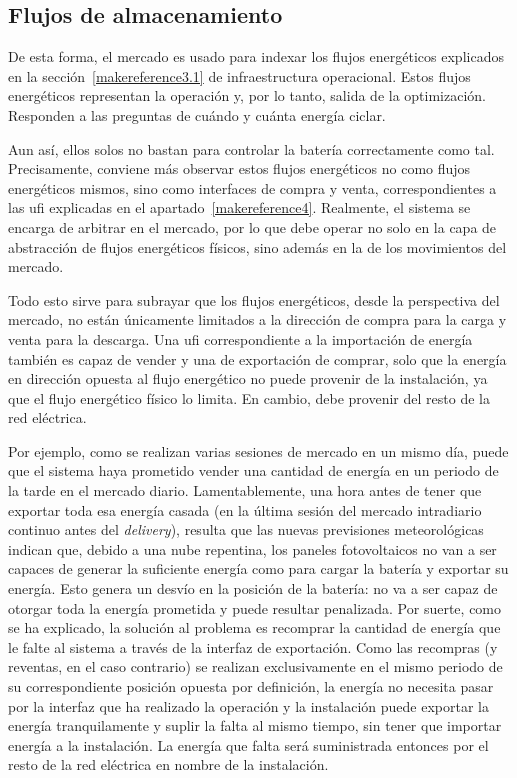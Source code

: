 \subsection{Flujos de almacenamiento}%
\label{makereference5.1.2}

De esta forma, el mercado es usado para indexar los flujos energéticos explicados en la sección~\ref{makereference3.1} de infraestructura operacional. Estos flujos energéticos representan la operación y, por lo tanto, salida de la optimización. Responden a las preguntas de cuándo y cuánta energía ciclar.

Aun así, ellos solos no bastan para controlar la batería correctamente como tal. Precisamente, conviene más observar estos flujos energéticos no como flujos energéticos mismos, sino como interfaces de compra y venta, correspondientes a las \gls{ufi} explicadas en el apartado~\ref{makereference4}. Realmente, el sistema se encarga de arbitrar en el mercado, por lo que debe operar no solo en la capa de abstracción de flujos energéticos físicos, sino además en la de los movimientos del mercado.

Todo esto sirve para subrayar que los flujos energéticos, desde la perspectiva del mercado, no están únicamente limitados a la dirección de compra para la carga y venta para la descarga. Una \gls{ufi} correspondiente a la importación de energía también es capaz de vender y una de exportación de comprar, solo que la energía en dirección opuesta al flujo energético no puede provenir de la instalación, ya que el flujo energético físico lo limita. En cambio, debe provenir del resto de la red eléctrica.

Por ejemplo, como se realizan varias sesiones de mercado en un mismo día, puede que el sistema haya prometido vender una cantidad de energía en un periodo de la tarde en el mercado diario. Lamentablemente, una hora antes de tener que exportar toda esa energía casada (en la última sesión del mercado intradiario continuo antes del \textit{delivery}), resulta que las nuevas previsiones meteorológicas indican que, debido a una nube repentina, los paneles fotovoltaicos no van a ser capaces de generar la suficiente energía como para cargar la batería y exportar su energía. Esto genera un desvío en la posición de la batería: no va a ser capaz de otorgar toda la energía prometida y puede resultar penalizada. Por suerte, como se ha explicado, la solución al problema es recomprar la cantidad de energía que le falte al sistema a través de la interfaz de exportación. Como las recompras (y reventas, en el caso contrario) se realizan exclusivamente en el mismo periodo de su correspondiente posición opuesta por definición, la energía no necesita pasar por la interfaz que ha realizado la operación y la instalación puede exportar la energía tranquilamente y suplir la falta al mismo tiempo, sin tener que importar energía a la instalación. La energía que falta será suministrada entonces por el resto de la red eléctrica en nombre de la instalación.


